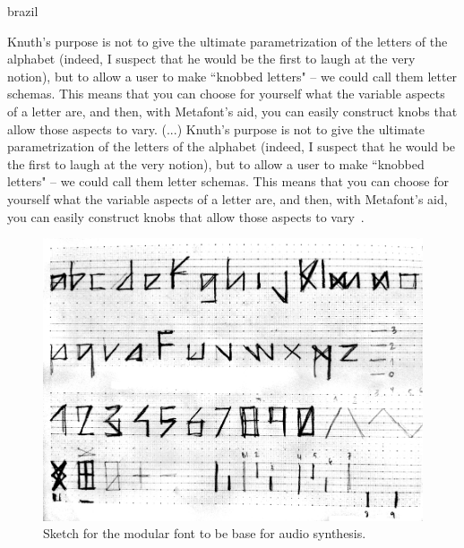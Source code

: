 \begin{otherlanguage*}{brazil}
\begin{citacao}
Knuth's purpose is not to give the ultimate parametrization of the letters of the alphabet (indeed, I suspect that he would be the first to laugh at the very notion), but to allow a user to make ``knobbed letters" -- we could call them letter schemas. This means that you can choose for yourself what the variable aspects of a letter are, and then, with Metafont's aid, you can easily construct knobs that allow those aspects to vary. 
(...)
Knuth's purpose is not to give the ultimate parametrization of the letters of the alphabet (indeed, I suspect that he would be the first to laugh at the very notion), but to allow a user to make ``knobbed letters" -- we could call them letter schemas. This means that you can choose for yourself what the variable aspects of a letter are, and then, with Metafont's aid, you can easily construct knobs that allow those aspects to vary~\cite{Metamagical1986}. 
\end{citacao}






\begin{figure}[!ht]
   \centering
       \includegraphics[width=0.8\linewidth]{pictures/audiotype_sketch}
   \caption{Sketch for the modular font to be base for audio synthesis.}
    \label{fig:sketch}
 \end{figure}



\end{otherlanguage*}
